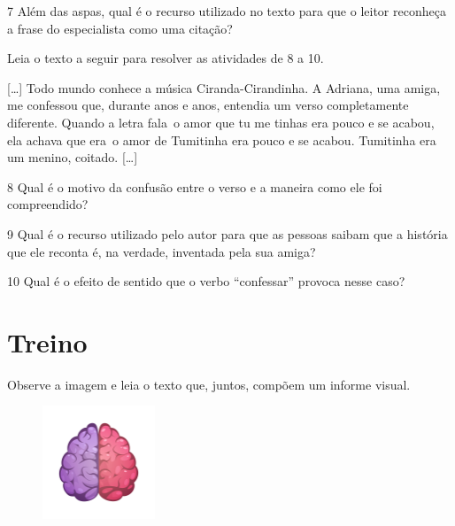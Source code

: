 \num{7} Além das aspas, qual é o recurso utilizado no texto para que o
leitor reconheça a frase do especialista como uma citação?


Leia o texto a seguir para resolver as atividades de 8 a 10.

\begin{myquote}
{[}\ldots{]} Todo mundo conhece a música Ciranda-Cirandinha. A Adriana,
uma amiga, me confessou que, durante anos e anos, entendia um verso
completamente diferente. Quando a letra fala~o amor que tu me tinhas era
pouco e se acabou, ela achava que era~o amor de Tumitinha era pouco e se
acabou. Tumitinha era um menino, coitado. {[}\ldots{]}

\end{myquote}

\num{8} Qual é o motivo da confusão entre o verso e a maneira como ele
foi compreendido?


\num{9} Qual é o recurso utilizado pelo autor para que as pessoas saibam
que a história que ele reconta é, na verdade, inventada pela sua amiga?


\num{10} Qual é o efeito de sentido que o verbo ``confessar'' provoca
nesse caso?


\section*{Treino}

Observe a imagem e leia o texto que, juntos, compõem um informe
visual.

\begin{figure}[H]
\centering\includegraphics[width=0.3\textwidth]{./imgSAEB_6_POR/freepik/PORT_6_IMG-19.jpeg}
\end{figure}

